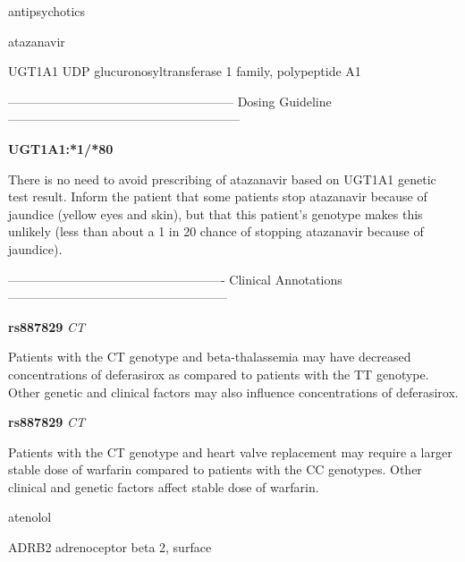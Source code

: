 \documentclass{resume} %
\begin{document}
\begin{rSection}{ antipsychotics }
\end{rSection}\begin{rSection}{ atazanavir }
\item[]

\begin{rSubsection}{ UGT1A1 }{ UDP glucuronosyltransferase 1 family, polypeptide A1 }{}{}
\item[]
\item[] ------------------------------------------------------ Dosing Guideline --------------------------------------------------------\newline
\item[] \textbf{ UGT1A1:*1/*80 }

\item[] There is no need to avoid prescribing of atazanavir based on UGT1A1 genetic test result. Inform the patient that some patients stop atazanavir because of jaundice (yellow eyes and skin), but that this patient’s genotype makes this unlikely (less than about a 1 in 20 chance of stopping atazanavir because of jaundice).
\item[] ---------------------------------------------------- Clinical Annotations -----------------------------------------------------\newline
\item \textbf{ rs887829 } \textit{ CT }
\item[] Patients with the CT genotype and beta-thalassemia may have decreased concentrations of deferasirox as compared to patients with the TT genotype. Other genetic and clinical factors may also influence concentrations of deferasirox.\item \textbf{ rs887829 } \textit{ CT }
\item[] Patients with the CT genotype and heart valve replacement may require a larger stable dose of warfarin compared to patients with the CC genotypes. Other clinical and genetic factors affect stable dose of warfarin.
\end{rSubsection}

\end{rSection}\begin{rSection}{ atenolol }
\item[]

\begin{rSubsection}{ ADRB2 }{ adrenoceptor beta 2, surface }{}{}
\item[]


\end{rSubsection}
\end{rSection}
\end{document}

